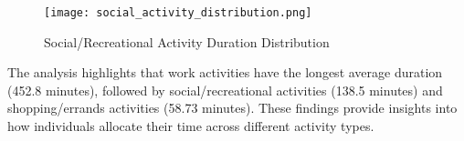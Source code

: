 \begin{figure}[h!]
    \centering
    \texttt{[image: social\_activity\_distribution.png]}
    \caption{Social/Recreational Activity Duration Distribution}
    \label{fig:social_duration}
\end{figure}


The analysis highlights that work activities have the longest average duration (452.8 minutes), followed by social/recreational activities (138.5 minutes) and shopping/errands activities (58.73 minutes). These findings provide insights into how individuals allocate their time across different activity types.